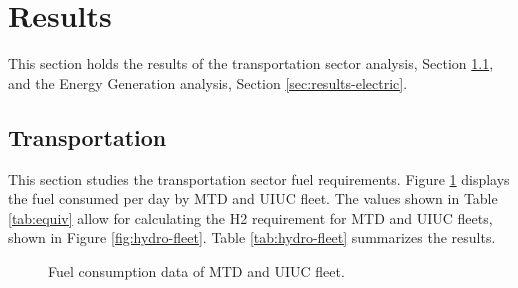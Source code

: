 \section{Results}
\label{sec:hydro-results}

This section holds the results of the transportation sector analysis, Section \ref{sec:results-transport}, and the Energy Generation analysis, Section \ref{sec:results-electric}.

\subsection{Transportation}
\label{sec:results-transport}

This section studies the transportation sector fuel requirements.
Figure \ref{fig:fuel} displays the fuel consumed per day by \gls{MTD} and \gls{UIUC} fleet.
The values shown in Table \ref{tab:equiv} allow for calculating the \gls{H2} requirement for MTD and UIUC fleets, shown in Figure \ref{fig:hydro-fleet}.
Table \ref{tab:hydro-fleet} summarizes the results.

	\begin{figure}[htbp!]
		\centering
		\hfill
		\caption{Fuel consumption data of MTD and UIUC fleet.}
		\label{fig:fuel}
	\end{figure}

